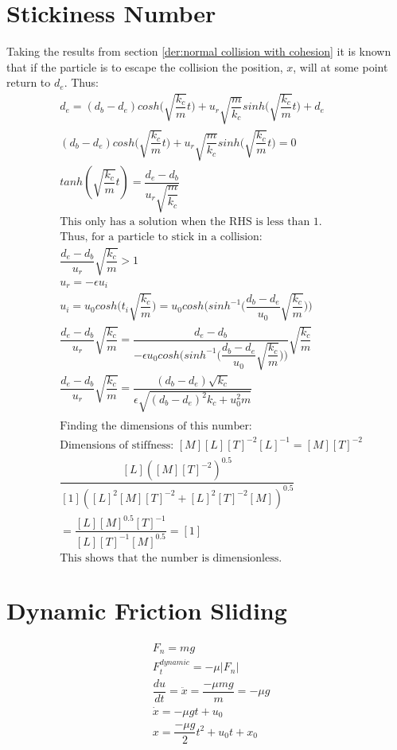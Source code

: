 \documentclass[10pt,a4paper,titlepage]{report}
\begin{document}
\section{Stickiness Number}
Taking the results from section \ref{der:normal collision with cohesion} it is known that if the particle is to escape the collision the position, $x$, will at some point return to $d_e$. Thus:
\begin{align*}
&d_e = (d_b - d_e)cosh\Big(\sqrt{\dfrac{k_c}{m}} t\Big) + u_r \sqrt{\dfrac{m}{k_c}} sinh\Big(\sqrt{\dfrac{k_c}{m}}t\Big) + d_e \\
&(d_b - d_e)cosh\Big(\sqrt{\dfrac{k_c}{m}} t\Big) + u_r \sqrt{\dfrac{m}{k_c}} sinh\Big(\sqrt{\dfrac{k_c}{m}}t\Big) = 0 \\
&tanh(\sqrt{\dfrac{k_c}{m}} t) = \dfrac{d_e - d_b}{u_r \sqrt{\dfrac{m}{k_c}}} \\
&\text{This only has a solution when the RHS is less than 1.} \\
&\text{Thus, for a particle to stick in a collision:} \\
&\dfrac{d_e - d_b}{u_r}\sqrt{\dfrac{k_c}{m}} > 1 \\
&u_r = -\epsilon u_i \\
&u_i = u_0 cosh\Big(t_i \sqrt{\dfrac{k_c}{m}}\Big) = u_0 cosh\Big(sinh^{-1}\Big(\dfrac{d_b - d_e}{u_0}\sqrt{\dfrac{k_c}{m}}\Big)\Big) \\
&\dfrac{d_e - d_b}{u_r}\sqrt{\dfrac{k_c}{m}} = \dfrac{d_e - d_b}{-\epsilon u_0 cosh\Big(sinh^{-1}\Big(\dfrac{d_b - d_e}{u_0}\sqrt{\dfrac{k_c}{m}}\Big)\Big)}\sqrt{\dfrac{k_c}{m}} \\
&\dfrac{d_e - d_b}{u_r}\sqrt{\dfrac{k_c}{m}} = \dfrac{(d_b - d_e)\sqrt{k_c}}{\epsilon \sqrt{(d_b - d_e)^2 k_c + u_0 ^ 2 m}} \\\\
&\text{Finding the dimensions of this number:} \\
&\text{Dimensions of stiffness: } [M][L][T]^{-2}[L]^{-1} = [M][T]^{-2} \\
&\dfrac{[L]([M][T]^{-2})^{0.5}}{[1]([L]^2[M][T]^{-2} + [L]^2[T]^{-2}[M])^{0.5}} \\
& = \dfrac{[L][M]^{0.5}[T]^{-1}}{[L][T]^{-1}[M]^{0.5}} = [1] \\
&\text{This shows that the number is dimensionless.}
\end{align*}
\section{Dynamic Friction Sliding}
\begin{align*}
&F_n = mg \\
&F_t^{dynamic} = - \mu |F_n| \\
&\dfrac{du}{dt} = \ddot{x} = \dfrac{- \mu m g}{m} = - \mu g\\
&\dot{x} = - \mu g t + u_0 \\
&x = \dfrac{- \mu g}{2}t^2 + u_0 t + x_0 \\
\end{align*}
\end{document}

